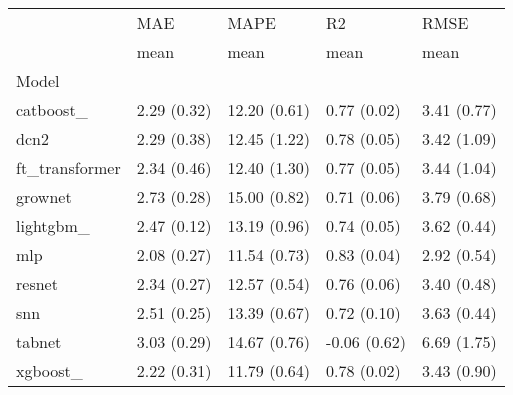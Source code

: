 \begin{tabular}{lllll}
\toprule
{} &          MAE &          MAPE &            R2 &         RMSE \\
{} &         mean &          mean &          mean &         mean \\
Model          &              &               &               &              \\
\midrule
catboost\_      &  2.29 (0.32) &  12.20 (0.61) &   0.77 (0.02) &  3.41 (0.77) \\
dcn2           &  2.29 (0.38) &  12.45 (1.22) &   0.78 (0.05) &  3.42 (1.09) \\
ft\_transformer &  2.34 (0.46) &  12.40 (1.30) &   0.77 (0.05) &  3.44 (1.04) \\
grownet        &  2.73 (0.28) &  15.00 (0.82) &   0.71 (0.06) &  3.79 (0.68) \\
lightgbm\_      &  2.47 (0.12) &  13.19 (0.96) &   0.74 (0.05) &  3.62 (0.44) \\
mlp            &  2.08 (0.27) &  11.54 (0.73) &   0.83 (0.04) &  2.92 (0.54) \\
resnet         &  2.34 (0.27) &  12.57 (0.54) &   0.76 (0.06) &  3.40 (0.48) \\
snn            &  2.51 (0.25) &  13.39 (0.67) &   0.72 (0.10) &  3.63 (0.44) \\
tabnet         &  3.03 (0.29) &  14.67 (0.76) &  -0.06 (0.62) &  6.69 (1.75) \\
xgboost\_       &  2.22 (0.31) &  11.79 (0.64) &   0.78 (0.02) &  3.43 (0.90) \\
\bottomrule
\end{tabular}
